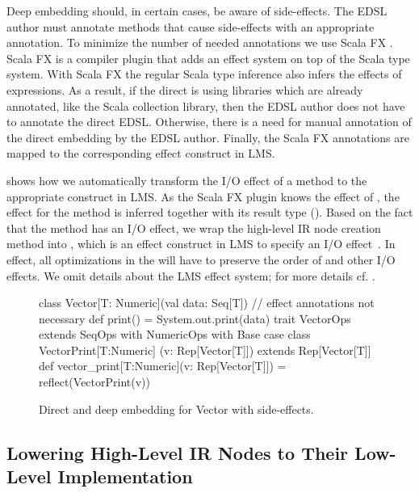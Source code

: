 
Deep embedding should, in certain cases, be aware of side-effects. The EDSL
author must annotate methods that cause side-effects with an appropriate
annotation. To minimize the number of needed annotations we use Scala FX
\cite{rytz2012lightweight}. Scala FX is a compiler plugin that adds an effect
system on top of the Scala type system. With Scala FX the regular Scala type
inference also infers the effects of expressions. As a result, if the direct
\edsl is using libraries which are already annotated, like the Scala collection
library, then the EDSL author does not have to annotate the direct EDSL.
Otherwise, there is a need for manual annotation of the direct embedding by
the EDSL author. Finally, the Scala FX annotations are mapped to the
corresponding effect construct in LMS.

 shows how we automatically transform the I/O
effect of a  method to the appropriate construct in LMS. As the
Scala FX plugin knows the effect of , the effect for
the  method is inferred together with its result type
(). Based on the fact that the  method has an I/O
effect, we wrap the high-level IR node creation method into
, which is an effect construct in LMS to specify an I/O
effect~\cite{rompf_building-blocks_2011}. In effect, all optimizations in the \edsl
will have to preserve the order of  and other I/O effects. We omit details
about the LMS effect system; for more details cf. \cite{rompf_building-blocks_2011}.

\begin{figure}
\begin{listingtiny}
class Vector[T: Numeric](val data: Seq[T]) {
  // effect annotations not necessary
  def print() = System.out.print(data)
}
trait VectorOps extends SeqOps with
  NumericOps with Base {
  case class VectorPrint[T:Numeric]
    (v: Rep[Vector[T]]) extends Rep[Vector[T]]
  def vector_print[T:Numeric](v: Rep[Vector[T]]) =
    reflect(VectorPrint(v))
}
\end{listingtiny}
\caption{\label{lst:vector_deep_fx} Direct and deep embedding for Vector with side-effects.}
\end{figure}

\subsection{Lowering High-Level IR Nodes to Their Low-Level Implementation}
\label{sec:yy-impl-lower}

